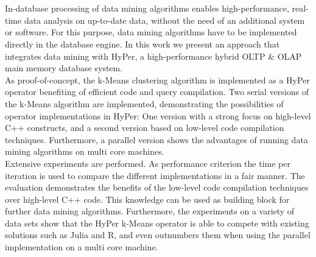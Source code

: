 \chapter{\abstractname}

In-database processing of data mining algorithms enables high-performance, real-time data analysis on up-to-date data, without the need of an additional system or software. For this purpose, data mining algorithms have to be implemented directly in the database engine. In this work we present an approach that integrates data mining with HyPer, a high-performance hybrid OLTP \& OLAP main memory database system.
\\
As proof-of-concept, the k-Means clustering algorithm is implemented as a HyPer operator benefiting of efficient code and query compilation. Two serial versions of the k-Means algorithm are implemented, demonstrating the possibilities of operator implementations in HyPer: One version with a strong focus on high-level C++ constructs, and a second version based on low-level code compilation techniques. Furthermore, a parallel version shows the advantages of running data mining algorithms on multi core machines. 
\\
Extensive experiments are performed. As performance criterion the time per iteration is used to compare the different implementations in a fair manner. The evaluation demonstrates the benefits of the low-level code compilation techniques over high-level C++ code. This knowledge can be used as building block for further data mining algorithms. Furthermore, the experiments on a variety of data sets show that the HyPer k-Means operator is able to compete with existing solutions such as Julia and R, and even outnumbers them when using the parallel implementation on a multi core machine. 

